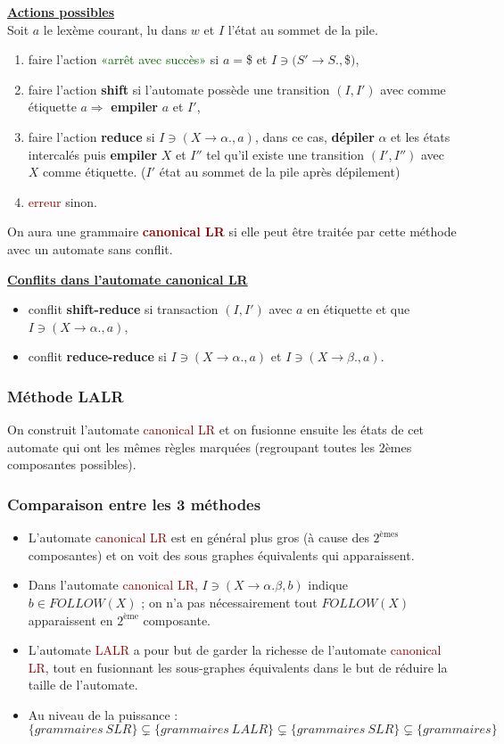 \documentclass{article}
\newcommand{\dred}[1]{\textcolor{darkred}{\textbf{#1}}}
\newcommand{\gre}[1]{\textcolor{darkgreen}{#1}}
\newcommand{\red}[1]{\textcolor{darkred}{#1}}
\newcommand{\stitre}[1]{\noindent\textbf{\underline{#1}}}
\begin{document}
\stitre{Actions possibles} \\
Soit $a$ le lexème courant, lu dans $w$ et $I$ l'état au sommet de la pile.
\begin{enumerate}
\item faire l'action \gre{«arrêt avec succès»} si $a=$\$ et $I \ni (S'\rightarrow S.,$\$$)$,
\item faire l'action \textbf{shift} si l'automate possède une transition $(I,I')$ avec comme étiquette $a \Rightarrow$ \textbf{empiler} $a$ et $I'$,
\item faire l'action \textbf{reduce} si $I\ni (X\rightarrow \alpha . , a)$, dans ce cas, \textbf{dépiler} $\alpha$ et les états intercalés puis \textbf{empiler} $X$ et $I''$ tel 
qu'il existe une transition $(I',I'')$ avec $X$ comme étiquette. ($I'$ état au sommet de la pile après dépilement)
\item \red{erreur} sinon.
\end{enumerate}
On aura une grammaire \dred{canonical LR} si elle peut être traitée par cette méthode avec un automate sans conflit.

\stitre{Conflits dans l'automate canonical LR}
\begin{itemize}
\item conflit \textbf{shift-reduce} si transaction $(I,I')$ avec $a$ en étiquette et que $I \ni (X \rightarrow \alpha ., a)$,
\item conflit \textbf{reduce-reduce} si $I \ni (X \rightarrow \alpha ., a)$ et $I \ni (X \rightarrow \beta ., a)$.
\end{itemize}

\subsubsection{Méthode LALR}

On construit l'automate \red{canonical LR} et on fusionne ensuite les états de cet automate qui ont les mêmes règles marquées (regroupant toutes les 2èmes composantes 
possibles). 

\subsubsection{Comparaison entre les 3 méthodes}

\begin{itemize}
\item L'automate \red{canonical LR} est en général plus gros (à cause des $2^{\text{èmes}}$ composantes) et on voit des sous graphes équivalents qui apparaissent.
\item Dans l'automate \red{canonical LR}, $I \ni (X\rightarrow \alpha . \beta, b)$ indique $b\in FOLLOW(X)$ ; on n'a pas nécessairement tout $FOLLOW(X)$ apparaissent en 
$2^{\text{ème}}$ composante.
\item L'automate \red{LALR} a pour but de garder la richesse de l'automate \red{canonical LR}, tout en fusionnant les sous-graphes équivalents dans le but de réduire la taille de 
l'automate.
\item Au niveau de la puissance : \[\{grammaires\ SLR\} \subsetneq \{grammaires\ LALR\} \subsetneq \{grammaires\ SLR\} \subsetneq \{grammaires\}\]
\end{itemize}
\end{document}
